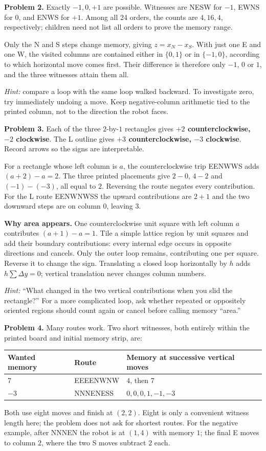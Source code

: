 \documentclass[11pt,letterpaper]{article}
\newcommand{\sectiontitle}[1]{\par\vspace{4pt}{\large\bfseries #1}\par}
\newcommand{\answer}[1]{\par\vspace{3pt}\textbf{Problem #1.} }
\begin{document}
\answer{2} Exactly \textbf{$-1,0,+1$} are possible. Witnesses are NESW for $-1$, EWNS for $0$, and ENWS for $+1$. Among all 24 orders, the counts are $4,16,4$, respectively; children need not list all orders to prove the memory range.

Only the N and S steps change memory, giving $z=x_N-x_S$. With just one E and one W, the visited columns are contained either in $\{0,1\}$ or in $\{-1,0\}$, according to which horizontal move comes first. Their difference is therefore only $-1$, $0$ or $1$, and the three witnesses attain them all.

\textit{Hint:} compare a loop with the same loop walked backward. To investigate zero, try immediately undoing a move. Keep negative-column arithmetic tied to the printed column, not to the direction the robot faces.

\answer{3} Each of the three $2$-by-$1$ rectangles gives \textbf{$+2$ counterclockwise, $-2$ clockwise}. The L outline gives \textbf{$+3$ counterclockwise, $-3$ clockwise}. Record arrows so the signs are interpretable.

For a rectangle whose left column is $a$, the counterclockwise trip EENWWS adds $(a+2)-a=2$. The three printed placements give $2-0$, $4-2$ and $(-1)-(-3)$, all equal to $2$. Reversing the route negates every contribution. For the L route EENWNWSS the upward contributions are $2+1$ and the two downward steps are on column $0$, leaving $3$.

\textbf{Why area appears.} One counterclockwise unit square with left column $a$ contributes $(a+1)-a=1$. Tile a simple lattice region by unit squares and add their boundary contributions: every internal edge occurs in opposite directions and cancels. Only the outer loop remains, contributing one per square. Reverse it to change the sign. Translating a closed loop horizontally by $h$ adds $h\sum\Delta y=0$; vertical translation never changes column numbers.

\textit{Hint:} ``What changed in the two vertical contributions when you slid the rectangle?'' For a more complicated loop, ask whether repeated or oppositely oriented regions should count again or cancel before calling memory ``area.''
\newpage
\sectiontitle{Controlling memory and the deeper connection}
\answer{4} Many routes work. Two short witnesses, both entirely within the printed board and initial memory strip, are:
\begin{center}\renewcommand{\arraystretch}{1.25}
\begin{tabular}{@{}lll@{}}
Wanted memory & Route & Memory at successive vertical moves\\\hline
$7$ & EEEENWNW & $4$, then $7$\\
$-3$ & NNNENESS & $0,0,0,1,-1,-3$
\end{tabular}\end{center}
Both use eight moves and finish at $(2,2)$. Eight is only a convenient witness length here; the problem does not ask for shortest routes. For the negative example, after NNNEN the robot is at $(1,4)$ with memory $1$; the final E moves to column $2$, where the two S moves subtract $2$ each.
\end{document}
